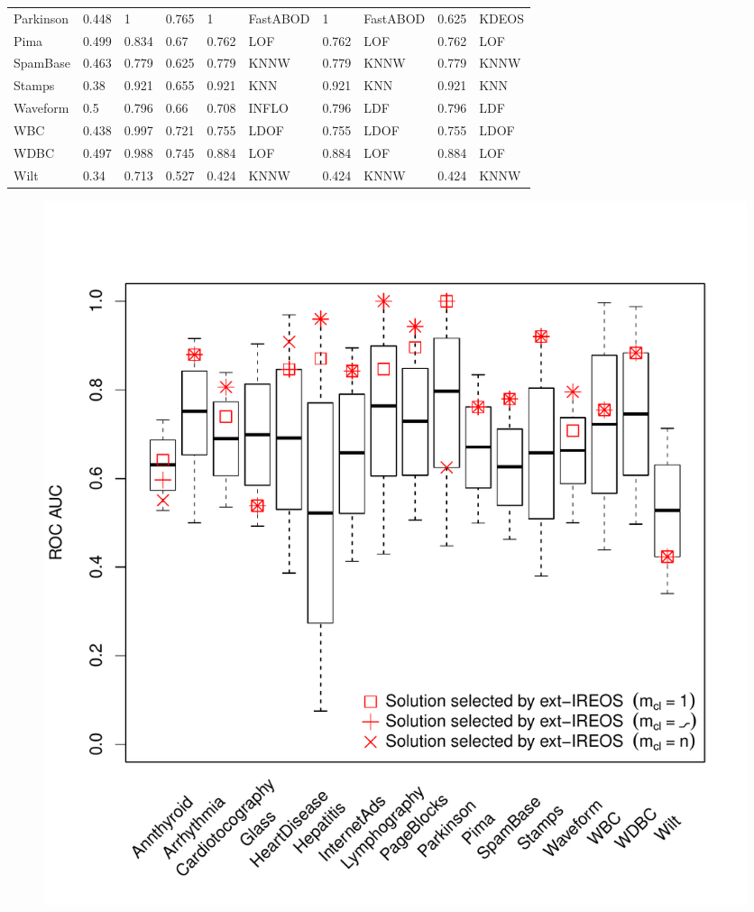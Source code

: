 \documentclass[11pt]{article}
\begin{document}
{\begin{table}[h!]
\begin{tabular}{@{}llllllllll@{}}
\multicolumn{1}{l|}{Parkinson} & 0.448 & 1 & \multicolumn{1}{l|}{0.765} & 1 & \multicolumn{1}{l|}{FastABOD} & 1 & \multicolumn{1}{l|}{FastABOD} & 0.625 & \multicolumn{1}{l|}{KDEOS}  \\ 
\multicolumn{1}{l|}{Pima} & 0.499 & 0.834 & \multicolumn{1}{l|}{0.67} & 0.762 & \multicolumn{1}{l|}{LOF} & 0.762 & \multicolumn{1}{l|}{LOF} & 0.762 & \multicolumn{1}{l|}{LOF}  \\ 
\multicolumn{1}{l|}{SpamBase} & 0.463 & 0.779 & \multicolumn{1}{l|}{0.625} & 0.779 & \multicolumn{1}{l|}{KNNW} & 0.779 & \multicolumn{1}{l|}{KNNW} & 0.779 & \multicolumn{1}{l|}{KNNW}  \\ 
\multicolumn{1}{l|}{Stamps} & 0.38 & 0.921 & \multicolumn{1}{l|}{0.655} & 0.921 & \multicolumn{1}{l|}{KNN} & 0.921 & \multicolumn{1}{l|}{KNN} & 0.921 & \multicolumn{1}{l|}{KNN}  \\ 
\multicolumn{1}{l|}{Waveform} & 0.5 & 0.796 & \multicolumn{1}{l|}{0.66} & 0.708 & \multicolumn{1}{l|}{INFLO} & 0.796 & \multicolumn{1}{l|}{LDF} & 0.796 & \multicolumn{1}{l|}{LDF}  \\ 
\multicolumn{1}{l|}{WBC} & 0.438 & 0.997 & \multicolumn{1}{l|}{0.721} & 0.755 & \multicolumn{1}{l|}{LDOF} & 0.755 & \multicolumn{1}{l|}{LDOF} & 0.755 & \multicolumn{1}{l|}{LDOF}  \\ 
\multicolumn{1}{l|}{WDBC} & 0.497 & 0.988 & \multicolumn{1}{l|}{0.745} & 0.884 & \multicolumn{1}{l|}{LOF} & 0.884 & \multicolumn{1}{l|}{LOF} & 0.884 & \multicolumn{1}{l|}{LOF}  \\ 
\multicolumn{1}{l|}{Wilt} & 0.34 & 0.713 & \multicolumn{1}{l|}{0.527} & 0.424 & \multicolumn{1}{l|}{KNNW} & 0.424 & \multicolumn{1}{l|}{KNNW} & 0.424 & \multicolumn{1}{l|}{KNNW}  \\   \bottomrule
\end{tabular}
\end{table}
\newpage
\begin{figure}[ht!]
\center
\includegraphics[width=\textwidth]{figs/boxplot.pdf}

\end{figure}}
\end{document}
